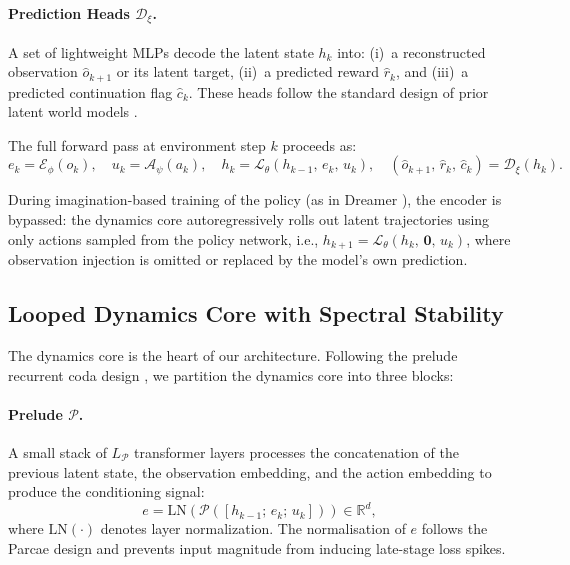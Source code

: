 \paragraph{Prediction Heads $\mathcal{D}_\xi$.} A set of lightweight MLPs decode the latent state $h_k$ into: (i)~a reconstructed observation $\hat{o}_{k+1}$ or its latent target, (ii)~a predicted reward $\hat{r}_k$, and (iii)~a predicted continuation flag $\hat{c}_k$. These heads follow the standard design of prior latent world models \citep{hafner2020dreamerv1, hafner2021dreamerv2, hafner2025dreamerv3}.

The full forward pass at environment step $k$ proceeds as:
\begin{equation}
  e_k = \mathcal{E}_\phi(o_k), \quad
  u_k = \mathcal{A}_\psi(a_k), \quad
  h_k = \mathcal{L}_\theta(h_{k-1},\, e_k,\, u_k), \quad
  (\hat{o}_{k+1},\, \hat{r}_k,\, \hat{c}_k)
    = \mathcal{D}_\xi(h_k).
  \label{eq:full_forward}
\end{equation}

During imagination-based training of the policy (as in Dreamer \citep{hafner2020dreamerv1}), the encoder is bypassed: the dynamics core autoregressively rolls out latent trajectories using only actions sampled from the policy network, i.e., $h_{k+1} = \mathcal{L}_\theta(h_k,\, \mathbf{0},\, u_k)$, where observation injection is omitted or replaced by the model's own prediction.

\subsection{Looped Dynamics Core with Spectral Stability}
\label{sec:dynamics}

The dynamics core is the heart of our architecture. Following the prelude recurrent coda design \citep{geiping2025rdm, prairie2026parcae, zeitoun2026hyperloop}, we partition the dynamics core into three blocks:

\paragraph{Prelude $\mathcal{P}$.} A small stack of $L_\mathcal{P}$ transformer layers processes the concatenation of the previous latent state, the observation embedding, and the action embedding to produce the conditioning signal:
\begin{equation}
  e = \mathrm{LN}\!\left(
    \mathcal{P}\!\left(
      [h_{k-1};\, e_k;\, u_k]
    \right)
  \right) \in \mathbb{R}^{d},
  \label{eq:prelude}
\end{equation}
where $\mathrm{LN}(\cdot)$ denotes layer normalization. The normalisation of $e$ follows the Parcae design \citep{prairie2026parcae} and prevents input magnitude from inducing late-stage loss spikes.

